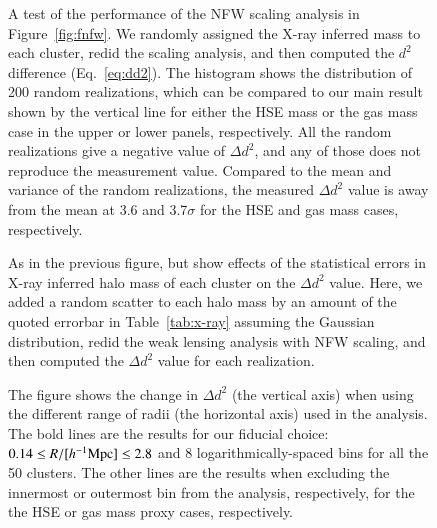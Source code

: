 \documentclass[iop, apj]{emulateapj}
\newcommand{\?}{\stackrel{?}{=}}
\begin{document}
%
\begin{figure}
 \caption{A test of the performance of the NFW scaling analysis in
 Figure~\ref{fig:fnfw}. We randomly assigned the X-ray inferred mass to
 each cluster, redid the scaling analysis, and then computed the
 $d^2$ difference (Eq.~\ref{eq:dd2}).
 The histogram shows the distribution of 200 random realizations, which
 can be compared to our main result shown by the vertical line for
 either the HSE mass or the gas mass case in the upper or lower panels,
 respectively.  All the random realizations give a negative value of
 $\Delta d^2$, and any of those does not reproduce the measurement
 value.  Compared to the mean and variance of the random realizations,
 the measured $\Delta d^2$ value is away from the mean at 3.6 and
 3.7$\sigma$ for the HSE and gas mass cases, respectively.
 \label{fig:d2_Mrandom} }
\end{figure}
%
 \begin{figure}
%
%
  \caption{As in the previous figure, but show effects of the
  statistical errors in X-ray inferred halo mass of each cluster on the
  $\Delta d^2$ value.  Here, we added a random scatter to each halo mass
  by an amount of the quoted errorbar in Table~\ref{tab:x-ray} assuming
  the Gaussian distribution, redid the weak lensing analysis with NFW
  scaling, and then computed the $\Delta d^2$ value for each
  realization.  \label{fig:d2_Merrors}}
 \end{figure}
 \begin{figure}
%
%
  \caption{The figure shows the change in $\Delta d^2$ (the vertical axis)
when using the different range of radii (the horizontal axis) used in
the analysis. The bold lines are the results for our fiducial choice:
 $0.14\le R/[h^{-1}{\rm Mpc}]\le 2.8$ and 8 logarithmically-spaced bins
for all the 50 clusters. The other lines are the results when excluding
the innermost or outermost bin from the analysis, respectively, for the
the HSE or gas mass proxy cases, respectively.
 }
\label{fig:d2_data_range}
 \end{figure}
\end{document}

